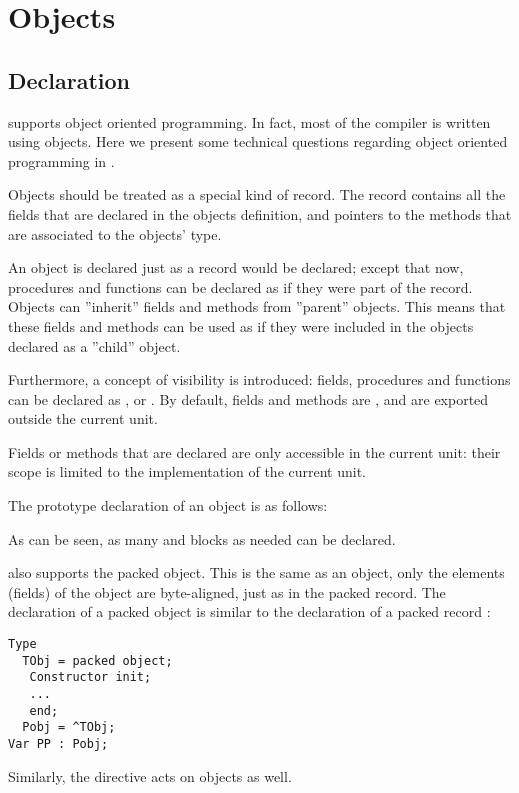 \chapter{Objects}
\label{ch:Objects}

\section{Declaration}
\fpc supports object oriented programming. In fact, most  of the compiler is
written using objects. Here we present some technical questions regarding
object oriented programming in \fpc.

Objects should be treated as a special kind of record. The record contains
all the fields that are declared in the objects definition, and pointers
to the methods that are associated to the objects' type.

An object is declared just as a record would be declared; except that
now, procedures and functions can be declared as if they were part of the record.
Objects can ''inherit'' fields and methods from ''parent'' objects. This means
that these fields and methods can be used as if they were included in the
objects declared as a ''child'' object.

Furthermore, a concept of visibility  is introduced: 
fields, procedures and functions can be declared as ,
 or 
. By default, fields and methods are , and 
are exported outside the current unit. 

Fields or methods that are declared  are only accessible 
in the current unit: their scope is limited to the implementation of the
current unit.

The prototype declaration of an object is as follows:

As can be seen, as many  and  blocks as needed can be
declared.


\begin{remark}
\fpc also supports the packed object. This is the same as an object, only
the elements (fields) of the object are byte-aligned, just as in the packed
record.
The declaration of a packed object is similar to the declaration
of a packed record :
\begin{verbatim}
Type
  TObj = packed object;
   Constructor init;
   ...
   end;
  Pobj = ^TObj;
Var PP : Pobj;
\end{verbatim}
Similarly, the  directive acts on objects as well.
\end{remark}

